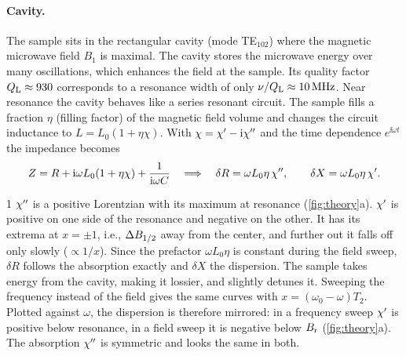 \paragraph{Cavity.}
The sample sits in the rectangular cavity (mode TE$_{102}$) where the magnetic microwave field $B_1$ is maximal.
The cavity stores the microwave energy over many oscillations, which enhances the field at the sample. Its
quality factor $Q_\mathrm{L}\approx930$ corresponds to a resonance width of only $\nu/Q_\mathrm{L}\approx\qty{10}{MHz}$. Near resonance
the cavity behaves like a series resonant circuit. The sample fills a fraction $\eta$ (filling factor) of the magnetic
field volume and changes the circuit inductance to $L=L_0(1+\eta\chi)$. With
$\chi=\chi'-\mathrm{i}\chi''$ and the time dependence $e^{\ii\omega t}$ the impedance becomes
\begin{equation}\label{eq:rx}
  Z=R+\mathrm{i}\omega L_0(1+\eta\chi)+\frac{1}{\mathrm{i}\omega C}
  \quad\Longrightarrow\quad
  \delta R=\omega L_0\eta\,\chi'',\qquad \delta X=\omega L_0\eta\,\chi' .
\end{equation}

\begin{exercise}{1}
$\chi''$ is a positive Lorentzian with its maximum at resonance (\cref{fig:theory}a). $\chi'$ is positive on one
side of the resonance and negative on the other. It has its extrema at $x=\pm1$, i.e., $\Delta B_{1/2}$ away from the center,
and further out it falls off only slowly ($\propto1/x$). Since the prefactor $\omega L_0\eta$ is constant during the
field sweep, $\delta R$ follows the absorption exactly and $\delta X$ the dispersion. The sample takes energy from the
cavity, making it lossier, and slightly detunes it. Sweeping the frequency instead of the field gives the same
curves with $x=(\omega_0-\omega)T_2$. Plotted against $\omega$, the dispersion is therefore mirrored: in a
frequency sweep $\chi'$ is positive below resonance, in a field sweep it is negative below $B_\mathrm{r}$ (\cref{fig:theory}a).
The absorption $\chi''$ is symmetric and looks the same in both.
\end{exercise}

